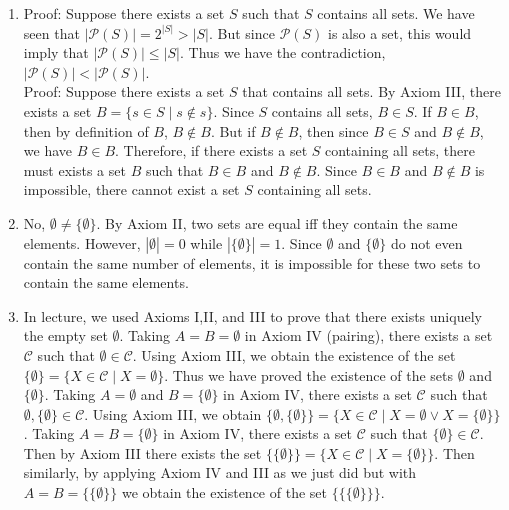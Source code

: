 \documentclass[a4paper]{article}
\begin{document}
\begin{enumerate}
	

\item

Proof: Suppose there exists a set $S$ such that $S$ contains all sets. 
We have seen that $|\mathcal{P}(S)| = 2^{|S|} > |S|$. But since $\mathcal{P}(S)$ is also a set, this would imply that $|\mathcal{P}(S)| \leq |S|$. Thus we have the contradiction,
$|\mathcal{P}(S)| < |\mathcal{P}(S)|$. \\

Proof: Suppose there exists a set $S$ that contains all sets. By Axiom III, there exists a set $B = \{s \in S \mid s \not\in s\}$. Since $S$ contains all sets, $B \in S$. If $B \in B$, then by definition of $B$, $B \not \in B$. But if $B \not \in B$, then since $B \in S$ and $B \not \in B$, we have $B \in B$. Therefore, if there exists a set $S$ containing all sets, there must exists a set $B$ such that $B \in B$ and $B \not \in B$. Since $B \in B$ and $B \not \in B$ is impossible, there cannot exist a set $S$ containing all sets.  

\item

No, $\emptyset \neq \{\emptyset\}$. By Axiom II, two sets are equal iff they contain the same elements. However, $|\emptyset| = 0$ while $|\{\emptyset \}| = 1$. Since $\emptyset$ and $\{\emptyset \}$ do not even contain the same number of elements, it is impossible for these two sets to contain the same elements. 
\item

In lecture, we used Axioms I,II, and III to prove that there exists uniquely the empty set $\emptyset$. Taking $A = B = \emptyset$ in Axiom IV (pairing), there exists a set $\mathcal{C}$ such that $\emptyset \in \mathcal{C}$. Using Axiom III, we obtain the existence of the set $\{\emptyset \} = \{X \in \mathcal{C} \mid X = \emptyset \}$. Thus we have proved the existence of the sets $\emptyset$ and $\{\emptyset \}$. Taking $A = \emptyset$ and $B = \{ \emptyset \}$ in Axiom IV, there exists a set $\mathcal{C}$ such that $\emptyset, \{\emptyset \} \in \mathcal{C}$. Using Axiom III, we obtain $\{\emptyset, \{\emptyset \} \} = \{X \in \mathcal{C} \mid X = \emptyset \lor X = \{\emptyset \} \}$. Taking $A = B = \{\emptyset \}$ in Axiom IV, there exists a set $\mathcal{C}$ such that $\{\emptyset \} \in \mathcal{C}$. Then by Axiom III there exists the set $\{\{\emptyset \} \} = \{ X \in \mathcal{C} \mid X = \{\emptyset \} \}$. Then similarly, by applying Axiom IV and III  as we just did but with $A = B = \{ \{\emptyset \} \}$ we obtain the existence of the set $\{\{\{\emptyset \} \} \}$. \\


\end{enumerate}
\end{document}
